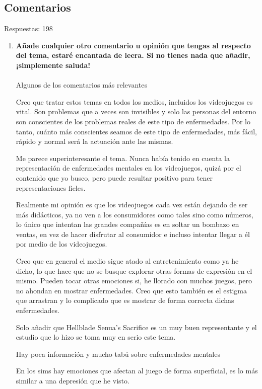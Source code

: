 \documentclass[12pt, a4paper,twoside,titlepage]{book}
\begin{document}
\subsection{Comentarios}
Respuestas: 198
\begin{enumerate}[label=\textbf{\arabic*}.]
     \item \textbf{ Añade cualquier otro comentario u opinión que tengas al respecto del tema, estaré encantada de leera. Si no tienes nada que añadir, ¡simplemente saluda!}\\
     \label{comentariosCastellano}\\
    Algunos de los comentarios más relevantes
    
    Creo que tratar estos temas en todos los medios, incluidos los videojuegos es vital. Son problemas que a veces son invisibles y solo las personas del entorno son conscientes de los problemas reales de este tipo de enfermedades. Por lo tanto, cuánto más conscientes seamos de este tipo de enfermedades, más fácil, rápido y normal será la actuación ante las mismas.
    
    Me parece superinteresante el tema. Nunca había tenido en cuenta la representación de enfermedades mentales en los videojuegos, quizá por el contenido que yo busco, pero puede resultar positivo para tener representaciones fieles.
    
    Realmente mi opinión es que los videojuegos cada vez están dejando de ser más didácticos, ya no ven a los consumidores como tales sino como números, lo único que intentan las grandes compañías es en soltar un bombazo en ventas, en vez de hacer disfrutar al consumidor e incluso intentar llegar a él por medio de los videojuegos.
    
    Creo que en general el medio sigue atado al entretenimiento como ya he dicho, lo que hace que no se busque explorar otras formas de expresión en el mismo. Pueden tocar otras emociones si, he llorado con muchos juegos, pero no ahondan en mostrar enfermedades. Creo que esto también es el estigma que arrastran y lo complicado que es mostrar de forma correcta dichas enfermedades.
    
    Solo añadir que Hellblade Senua's Sacrifice es un muy buen representante y el estudio que lo hizo se toma muy en serio este tema.
    
    Hay poca información y mucho tabú sobre enfermedades mentales
    
    En los sims hay emociones que afectan al juego de forma superficial, es lo más similar a una depresión que he visto.
    

\end{enumerate}
\end{document}
